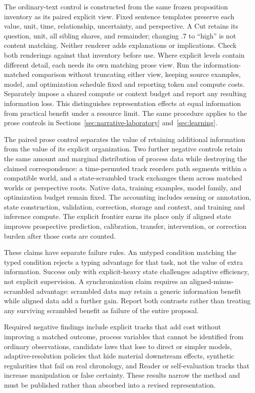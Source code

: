 \documentclass[10pt]{article}
\begin{document}
The ordinary-text control is constructed from the same frozen proposition
inventory as its paired explicit view. Fixed sentence templates preserve each
value, unit, time, relationship, uncertainty, and perspective. A Cut retains
its question, unit, all sibling shares, and remainder; changing $.7$ to ``high'' is
not content matching. Neither renderer adds explanations or implications.
Check both renderings against that inventory before use. Where explicit levels
contain different detail, each needs its own matching prose view.
Run the information-matched comparison without truncating either view, keeping
source examples, model, and optimization schedule fixed and reporting token
and compute costs. Separately impose a shared compute or context budget and
report any resulting information loss. This distinguishes representation
effects at equal information from practical benefit under a resource limit.
The same procedure applies to the prose controls in
Sections~\ref{sec:narrative-laboratory} and~\ref{sec:learning}.

The paired prose control separates the value of retaining additional
information from the value of its explicit organization.
Two further negative controls retain
the same amount and marginal distribution of process data while destroying the
claimed correspondence: a time-permuted track reorders path segments within a
compatible world, and a state-scrambled track exchanges them across matched
worlds or perspective roots. Native data, training examples, model family, and optimization
budget remain fixed. The accounting includes sensing or annotation, state
construction, validation, correction, storage and context, and training and
inference compute. The explicit frontier earns its place only if aligned state
improves prospective prediction, calibration, transfer, intervention, or
correction burden after those costs are counted.

These claims have separate failure rules. An untyped condition matching the typed condition rejects a
typing advantage for that task, not the value of extra information. Success
only with explicit-heavy state challenges adaptive efficiency, not explicit
supervision. A synchronization claim requires an aligned-minus-scrambled
advantage: scrambled data may retain a generic information benefit while
aligned data add a further gain. Report both contrasts rather than treating
any surviving scrambled benefit as failure of the entire proposal.

Required negative findings include explicit tracks that add cost without
improving a matched outcome, process variables that cannot be identified from
ordinary observations, candidate laws that lose to direct or simpler models,
adaptive-resolution policies that hide material downstream effects, synthetic
regularities that fail on real chronology, and Reader or self-evaluation tracks
that increase manipulation or false certainty. These results narrow the method
and must be published rather than absorbed into a revised representation.
\end{document}

